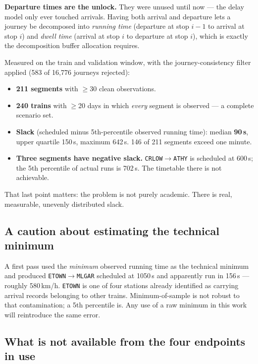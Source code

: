 \documentclass[11pt,a4paper]{article}
\newcommand{\code}[1]{\texttt{\small #1}}
\begin{document}
\textbf{Departure times are the unlock.} They were unused until now --- the delay model only
ever touched arrivals. Having both arrival and departure lets a journey be decomposed into
\emph{running time} (departure at stop $i-1$ to arrival at stop $i$) and \emph{dwell time}
(arrival at stop $i$ to departure at stop $i$), which is exactly the decomposition buffer
allocation requires.

Measured on the train and validation window, with the journey-consistency filter applied
(583 of 16{,}776 journeys rejected):

\begin{itemize}[leftmargin=1.4em,itemsep=0.2em]
  \item \textbf{211 segments} with $\ge$30 clean observations.
  \item \textbf{240 trains} with $\ge$20 days in which \emph{every} segment is observed ---
        a complete scenario set.
  \item \textbf{Slack} (scheduled minus 5th-percentile observed running time): median
        \textbf{90\,s}, upper quartile 150\,s, maximum 642\,s. 146 of 211 segments exceed
        one minute.
  \item \textbf{Three segments have negative slack.} \code{CRLOW}$\to$\code{ATHY} is
        scheduled at 600\,s; the 5th percentile of actual runs is 702\,s. The timetable
        there is not achievable.
\end{itemize}

That last point matters: the problem is not purely academic. There is real, measurable,
unevenly distributed slack.

\subsection*{A caution about estimating the technical minimum}

A first pass used the \emph{minimum} observed running time as the technical minimum and
produced \code{ETOWN}$\to$\code{MLGAR} scheduled at 1050\,s and apparently run in 156\,s
--- roughly 580\,km/h. \code{ETOWN} is one of four stations already identified as carrying
arrival records belonging to other trains. Minimum-of-sample is not robust to that
contamination; a 5th percentile is. Any use of a raw minimum in this work will reintroduce
the same error.

\subsection*{What is not available from the four endpoints in use}
\end{document}
